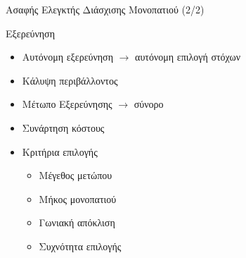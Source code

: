 \documentclass[10pt, compress, handout]{beamer} %
\begin{document}
\begin{frame}{Ασαφής Ελεγκτής Διάσχισης Μονοπατιού (2/2)}
\begin{minipage}{0.75\textwidth}
\begin{figure}
		\end{figure}
	\end{minipage}%
\end{frame}

\begin{frame}{Εξερεύνηση}
	\begin{itemize}
		\item Αυτόνομη εξερεύνηση $\rightarrow$ αυτόνομη επιλογή στόχων
		\item Κάλυψη περιβάλλοντος
		\item Μέτωπο Εξερεύνησης $\rightarrow$ σύνορο
		\item Συνάρτηση κόστους
		\item Κριτήρια επιλογής
		\begin{itemize}
			\item Μέγεθος μετώπου
			\item Μήκος μονοπατιού
			\item Γωνιακή απόκλιση
			\item Συχνότητα επιλογής
		\end{itemize}			
	\end{itemize}
\end{frame}

\end{document}
